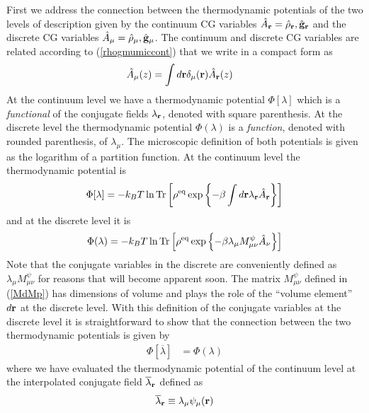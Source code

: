 \documentclass[b5paper,openright,10pt]{book}
\begin{document}
\begin{appendices}
First we  address the connection between  the thermodynamic potentials
of the two  levels of description given by the  continuum CG variables
$\hat{A}_{\bf  r}=\hat{\rho}_{\bf  r},\hat{\bf  g}_{\bf  r}$  and  the
discrete  CG  variables $\hat{A}_\mu=\hat{\rho}_\mu,\hat{\bf  g}_\mu$.
The  continuum and  discrete  CG variables  are  related according  to
(\ref{rhogmumiccont}) that we write in a compact form as
\begin{align}
  \hat{A}_\mu(z)&=\int d{\bf r}\delta_\mu({\bf r})\hat{A}_{\bf r}(z)
\end{align}
At   the   continuum  level   we   have   a  thermodynamic   potential
$\Phi[\lambda]$ which is a \textit{functional} of the conjugate fields
$\lambda_{\bf r}$,  denoted with square parenthesis.   At the discrete
level    the   thermodynamic    potential    $\Phi(\lambda)$   is    a
\textit{function}, denoted with rounded parenthesis, of $\lambda_\mu$.
The  microscopic  definition  of  both  potentials  is  given  as  the
logarithm  of  a  partition  function.  At  the  continuum  level  the
thermodynamic potential is
\begin{align}
  \Phi[\lambda]=-k_BT\ln{\rm Tr}\left[\rho^{\rm eq}\exp\left\{-\beta\int d{\bf r}\lambda_{\bf r}\hat{A}_{\bf r}\right\}\right]
 \end{align}
and at the discrete level it is 
  \begin{align}
  \Phi(\lambda)=-k_BT\ln{\rm Tr}\left[\rho^{\rm eq}\exp\left\{-\beta\lambda_{\mu}M^\psi_{\mu\nu}\hat{A}_{\nu}\right\}\right]
\end{align}
Note that  the conjugate  variables in  the discrete  are conveniently
defined as $\lambda_{\mu}M^\psi_{\mu\nu}$ for reasons that will become
apparent soon.   The matrix $M^\psi_{\mu\nu}$ defined  in (\ref{MdMp})
has dimensions of volume and plays  the role of the ``volume element''
$d{\bf  r}$  at the  discrete  level.   With  this definition  of  the
conjugate variables  at the  discrete level  it is  straightforward to
show that the  connection between the two  thermodynamic potentials is
given by
\begin{align}
  \Phi[\overline{\lambda}]&=  \Phi(\lambda)
\label{Phiphi}
\end{align}
where we have  evaluated the thermodynamic potential  of the continuum
level at the interpolated conjugate field $\overline{\lambda}_{\bf r}$
defined as
\begin{align}
  \overline{\lambda}_{\bf r}\equiv\lambda_\mu\psi_\mu({\bf r})
\end{align}

\end{appendices}
\end{document}
